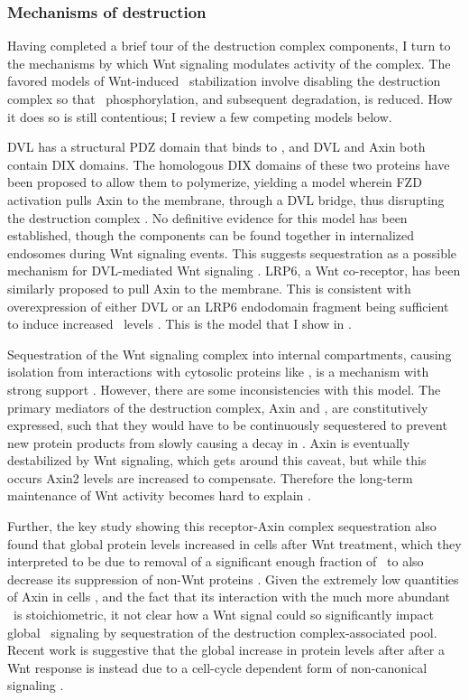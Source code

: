 \subsubsection{Mechanisms of destruction}


Having completed a brief tour of the destruction complex components,
I turn to the mechanisms by which Wnt signaling modulates activity of the complex.
The favored models of Wnt-induced \bcat\ stabilization involve
disabling the destruction complex so that \bcat\ phosphorylation,
and subsequent degradation, is reduced. How it does so is still contentious;
I review a few competing models below.


DVL has
a structural PDZ domain that binds to \fz, and DVL and Axin both contain
DIX domains. The homologous DIX domains of these two proteins have been proposed to
allow them to polymerize,
yielding a model wherein FZD activation pulls Axin to the membrane,
through a DVL bridge, thus disrupting the destruction complex \cite{MacDonald2009,Gao2010}.
No definitive evidence for this model has been
established, though the components can be found together in internalized endosomes during
Wnt signaling events. This suggests sequestration as a possible mechanism
for DVL-mediated Wnt signaling \cite{Angers2009}. LRP6, a Wnt co-receptor,
has been similarly proposed
to pull Axin to the membrane. This is consistent with overexpression of either DVL or an LRP6
endodomain fragment being sufficient to induce
increased \bcat\ levels \cite{MacDonald2009,Taelman2010}. This is the model
that I show in .


Sequestration of the Wnt signaling complex into internal
compartments, causing isolation from interactions with cytosolic proteins
like \bcat, is a mechanism with strong support \cite{Taelman2010}.
However, there are some inconsistencies with this model. The primary
mediators of the destruction complex, Axin and \gsk, are
constitutively expressed, such that they would have to be
continuously sequestered to prevent new protein products from slowly
causing a decay in \bcat. Axin is eventually destabilized by Wnt
signaling, which gets around this caveat, but while this occurs
Axin2 levels are increased to compensate. Therefore the long-term
maintenance of Wnt activity becomes hard to explain \cite{Hernandez2012}.


Further, the key study showing this receptor-Axin complex
sequestration also found that global protein levels increased in
cells after Wnt treatment, which they interpreted to be due to
removal of a significant enough fraction of \gsk\ to also decrease its
suppression of non-Wnt proteins \cite{Taelman2010}. Given the
extremely low quantities of Axin in cells \cite{Lee2003}, and the fact
that its interaction with the much more abundant \gsk\ is stoichiometric,
it not clear how a Wnt signal could so significantly impact global
\gsk\ signaling by sequestration of the destruction complex-associated pool.
Recent work is suggestive that the global increase in protein levels
after after a Wnt response is instead due to a cell-cycle dependent
form of non-canonical signaling \cite{Acebron2014}.


